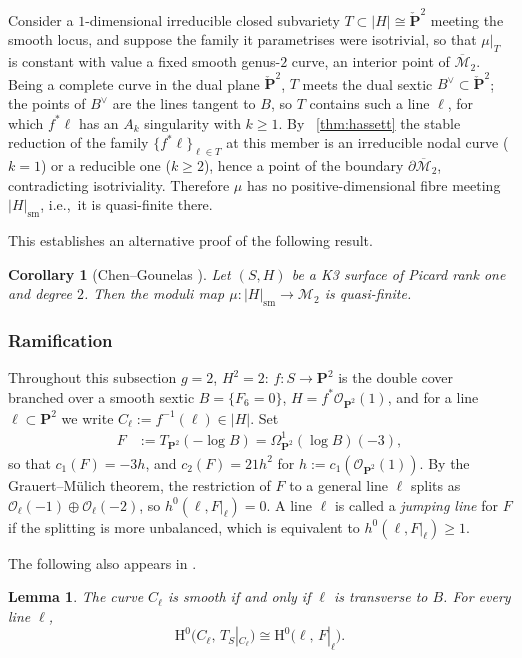 \documentclass[a4paper,12pt,twoside,reqno]{amsart}
\makeatletter
\numberwithin{equation}{section}
\def\cr@pref#1:#2\@nil{#1}
\newcommand{\cr@tsing}[1]{\@nameuse{cr@map@\cr@pref#1:\@nil}}
\newcommand{\Cref}[1]{\cr@tsing{#1}~\ref{#1}}
\theoremstyle{plain}
\newtheorem{lemma}[theorem]{Lemma}
\newtheorem{corollary}[theorem]{Corollary}
\theoremstyle{definition}
\newcommand{\PP}{\mathbf{P}}
\newcommand{\Oc}{\mathscr{O}}
\newcommand{\Om}{\Omega^1}
\newcommand{\sm}{\mathrm{sm}}
\newcommand{\Pdual}{\check{\PP}^2}
\newcommand{\Mmod}{\mathscr{M}}
\newcommand{\HH}{\mathrm{H}}
\newcommand{\OO}{\mathscr{O}}
\theoremstyle{plain}
\theoremstyle{definition}
\makeatother
\begin{document}
Consider a $1$-dimensional irreducible closed subvariety $T\subset|H|\cong\Pdual$ meeting the smooth locus, and suppose the family it parametrises were isotrivial, so that $\mu|_T$ is constant with value a fixed smooth genus-$2$ curve, an interior point of $\overline{\Mmod}_2$. Being a complete curve in the dual plane $\Pdual$, $T$ meets the dual sextic $B^\vee\subset\Pdual$; the points of $B^\vee$ are the lines tangent to $B$, so $T$ contains such a line $\ell$, for which $f^*\ell$ has an $A_k$ singularity with $k\ge1$. By \Cref{thm:hassett} the stable reduction of the family $\{f^*\ell\}_{\ell\in T}$ at this member is an irreducible nodal curve ($k=1$) or a reducible one ($k\ge2$), hence a point of the boundary $\partial\overline{\Mmod}_2$, contradicting isotriviality. Therefore $\mu$ has no positive-dimensional fibre meeting $|H|_{\sm}$, i.e.,\ it is quasi-finite there.

This establishes an alternative proof of the following result.

\begin{corollary}[{Chen--Gounelas \cite{CG}}]\label{thm:finiteness_h2}
Let $(S,H)$ be a K3 surface of Picard rank one and degree $2$. Then the moduli map $\mu \colon |H|_{\sm} \to \Mmod_2$ is quasi-finite.
\end{corollary}

\subsubsection{Ramification}

Throughout this subsection $g=2$, $H^2=2$: $f\colon S\to\PP^2$ is the double cover branched over a smooth sextic $B=\{F_6=0\}$, $H=f^*\Oc_{\PP^2}(1)$, and for a line $\ell\subset\PP^2$ we write $C_\ell:=f^{-1}(\ell)\in|H|$. Set
\[
\begin{aligned}
   F&:=T_{\PP^2}(-\log B)=\Om_{\PP^2}(\log B)(-3), 
\end{aligned}
\]
so that $c_1(F)=-3h$, and $c_2(F)=21h^2$ for $h:=c_1(\OO_{\PP^2}(1))$.
By the Grauert--M\"ulich theorem, the restriction of $F$ to a general line $\ell$ splits as $\Oc_\ell(-1)\oplus\Oc_\ell(-2)$, so $h^0(\ell,F|_\ell)=0$. A line $\ell$ is called a \emph{jumping line} for $F$ if the splitting is more unbalanced, which is equivalent to $h^0(\ell,F|_\ell)\ge1$.

The following also appears in \cite[Proposition~5.4]{DH}.

\begin{lemma}\label{lem:double-plane}
The curve $C_\ell$ is smooth if and only if $\ell$ is transverse to $B$.
For every line $\ell$, 
\[ 
   \HH^0\!\bigl(C_\ell,\,T_S|_{C_\ell}\bigr)\cong \HH^0\!\bigl(\ell,\,F|_\ell\bigr).
\]
\end{lemma}
\end{document}
